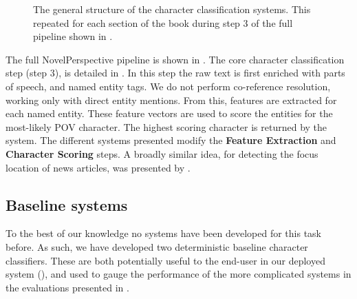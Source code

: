 \documentclass[11pt,a4paper]{article}
\newcommand{\textcite}{\cite}
\begin{document}
\begin{figure*}
	\caption{The general structure of the character classification systems. This repeated for each section of the book during step 3 of the full pipeline shown in . \label{fig:classify}}
\end{figure*}

The full NovelPerspective pipeline is shown in .
The core character classification step (step 3), is detailed in .
In this step the raw text is first enriched with parts of speech, and named entity tags.
We do not perform co-reference resolution, working only with direct entity mentions.
From this, features are extracted for each named entity.
These feature vectors are used to score the entities for the most-likely POV character.
The highest scoring character is returned by the system.
The different systems presented modify the \textbf{Feature Extraction} and \textbf{Character Scoring} steps.
A broadly similar idea, for detecting the focus location of news articles, was presented by \textcite{2017focus}.


\subsection{Baseline systems}
To the best of our knowledge no systems have been developed for this task before.
As such, we have developed two deterministic baseline character classifiers.
These are both potentially useful to the end-user in our deployed system (),
and used to gauge the performance of the more complicated systems in the evaluations presented in .
\end{document}
